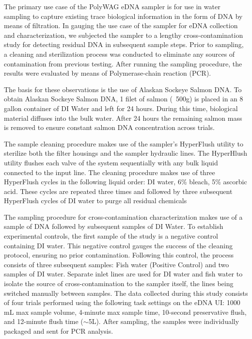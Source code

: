 \documentclass[11pt, letterpaper]{article}
\begin{document}
The primary use case of the PolyWAG eDNA sampler is for use in water sampling to capture existing trace biological information in the form of DNA by means of filtration. In gauging the use case of the sampler for eDNA collection and characterization, we subjected the sampler to a lengthy cross-contamination study for detecting residual DNA in subsequent sample steps. Prior to sampling, a cleaning and sterilization process was conducted to eliminate any sources of contamination from previous testing. After running the sampling procedure, the results were evaluated by means of Polymerase-chain reaction (PCR).
\newline\par\noindent
The basis for these observations is the use of Alaskan Sockeye Salmon DNA. To obtain Alaskan Sockeye Salmon DNA, 1 filet of salmon (~500g) is placed in an 8 gallon container of DI Water and left for 24 hours. During this time, biological material diffuses into the bulk water. After 24 hours the remaining salmon mass is removed to ensure constant salmon DNA concentration across trials.
\newline\par\noindent
The sample cleaning procedure makes use of the sampler’s HyperFlush utility to sterilize both the filter housings and the sampler hydraulic lines. The HyperHlush utility flushes each valve of the system sequentially with any bulk liquid connected to the input line. The cleaning procedure makes use of three HyperFlush cycles in the following liquid order: DI water, 6\% bleach, 5\% ascorbic acid. These cycles are repeated three times and followed by three subsequent HyperFlush cycles of DI water to purge all residual chemicals
\newline\par\noindent
The sampling procedure for cross-contamination characterization makes use of a sample of DNA followed by subsequent samples of DI Water. To establish experimental controls, the first sample of the study is a negative control containing DI water. This negative control gauges the success of the cleaning protocol, ensuring no prior contamination. Following this control, the process consists of three subsequent samples: Fish water (Positive Control) and two samples of DI water. Separate inlet lines are used for DI water and fish water to isolate the source of cross-contamination to the sampler itself, the lines being switched manually between samples. The data collected during this study consists of four trials performed using the following task settings on the eDNA UI: 1000 mL max sample volume, 4-minute max sample time, 10-second preservative flush, and 12-minute flush time ($\sim$5L). After sampling, the samples were individually packaged and sent for PCR analysis. 
\end{document}
